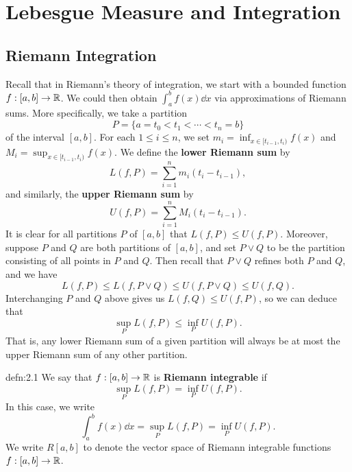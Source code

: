 \section{Lebesgue Measure and Integration}\label{sec:2}

\subsection{Riemann Integration}\label{subsec:2.1}
Recall that in Riemann's theory of integration, we start with a bounded function 
$f : [a, b] \to \mathbb{R}$. We could then obtain $\int_a^b f(x)\dd x$ via 
approximations of Riemann sums. More specifically, we take a partition 
\[ P = \{a = t_0 < t_1 < \cdots < t_n = b\} \] 
of the interval $[a, b]$. For each $1 \leq i \leq n$, we set 
$m_i = \inf_{x \in [t_{i-1}, t_i)} f(x)$ and 
$M_i = \sup_{x \in [t_{i-1}, t_i)} f(x)$. We define the {\bf lower 
Riemann sum} by 
\[ L(f, P) = \sum_{i=1}^n m_i(t_i - t_{i-1}), \] 
and similarly, the {\bf upper Riemann sum} by 
\[ U(f, P) = \sum_{i=1}^n M_i(t_i - t_{i-1}). \] 
It is clear for all partitions $P$ of $[a, b]$ that $L(f, P) \leq U(f, P)$. 
Moreover, suppose $P$ and $Q$ are both partitions of $[a, b]$, and set 
$P \vee Q$ to be the partition consisting of all points in $P$ and $Q$. 
Then recall that $P \vee Q$ refines both $P$ and $Q$, and we have 
\[ L(f, P) \leq L(f, P \vee Q) \leq U(f, P \vee Q) \leq U(f, Q). \] 
Interchanging $P$ and $Q$ above gives us $L(f, Q) \leq U(f, P)$, so we can 
deduce that 
\[ \sup_P L(f, P) \leq \inf_P U(f, P). \] 
That is, any lower Riemann sum of a given partition will always be at most 
the upper Riemann sum of any other partition. 

\begin{defn}{defn:2.1}
    We say that $f : [a, b] \to \mathbb{R}$ is {\bf Riemann integrable} if 
    \[ \sup_P L(f, P) = \inf_P U(f, P). \] 
    In this case, we write 
    \[ \int_a^b f(x)\dd x = \sup_P L(f, P) = \inf_P U(f, P). \] 
    We write $R[a, b]$ to denote the vector space of Riemann integrable 
    functions $f : [a, b] \to \mathbb{R}$. 
\end{defn}

